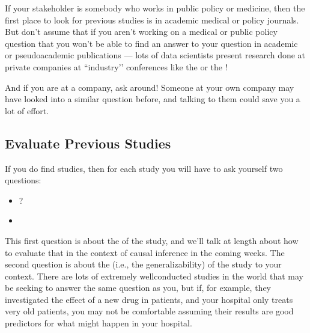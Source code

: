 \documentclass[letterpaper,10pt,english]{jupyterBook}
\begin{document}
\sphinxAtStartPar
If your stakeholder is somebody who works in public policy or medicine, then the first place to look for previous studies is in academic medical or policy journals. But don’t assume that if you aren’t working on a medical or public policy question that you won’t be able to find an answer to your question in academic or pseudo\sphinxhyphen{}academic publications — lots of data scientists present research done at private companies at ``industry’’ conferences like the  or the !

\sphinxAtStartPar
And if you are at a company, ask around! Someone at your own company may have looked into a similar question before, and talking to them could save you a lot of effort.


\subsection{Evaluate Previous Studies}
\label{\detokenize{30_questions/40_causal_questions_application:evaluate-previous-studies}}
\sphinxAtStartPar
If you do find studies, then for each study you will have to ask yourself two questions:
\begin{itemize}
\item {} 
\sphinxAtStartPar
{}?

\item {} 
\sphinxAtStartPar
{}

\end{itemize}

\sphinxAtStartPar
This first question is about the  of the study, and we’ll talk at length about how to evaluate that in the context of causal inference in the coming weeks. The second question is about the  (i.e., the generalizability) of the study to your context. There are lots of extremely well\sphinxhyphen{}conducted studies in the world that may be seeking to answer the same question as you, but if, for example, they investigated the effect of a new drug in  patients, and your hospital only treats very old patients, you may not be comfortable assuming their results are good predictors for what might happen in your hospital.
\end{document}
